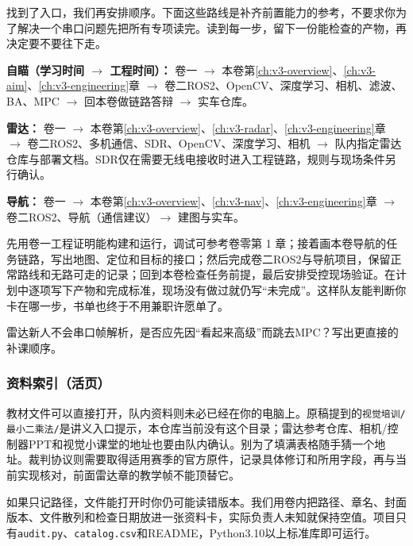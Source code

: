 找到了入口，我们再安排顺序。下面这些路线是补齐前置能力的参考，不要求你为了解决一个串口问题先把所有专项读完。读到每一步，留下一份能检查的产物，再决定要不要往下走。

\textbf{自瞄（学习时间 $\rightarrow$ 工程时间）：}
卷一 $\rightarrow$ 本卷第\ref{ch:v3-overview}、\ref{ch:v3-aim}、\ref{ch:v3-engineering}章 $\rightarrow$ 卷二ROS2、OpenCV、深度学习、相机、滤波、BA、MPC $\rightarrow$ 回本卷做链路答辩 $\rightarrow$ 实车仓库。

\textbf{雷达：}
卷一 $\rightarrow$ 本卷第\ref{ch:v3-overview}、\ref{ch:v3-radar}、\ref{ch:v3-engineering}章 $\rightarrow$ 卷二ROS2、多机通信、SDR、OpenCV、深度学习、相机 $\rightarrow$ 队内指定雷达仓库与部署文档。SDR仅在需要无线电接收时进入工程链路，规则与现场条件另行确认。

\textbf{导航：}
卷一 $\rightarrow$ 本卷第\ref{ch:v3-overview}、\ref{ch:v3-nav}、\ref{ch:v3-engineering}章 $\rightarrow$ 卷二ROS2、导航（通信建议）$\rightarrow$ 建图与实车。

\begin{example}[给导航新人排顺序]
先用卷一工程证明能构建和运行，调试可参考卷零第 1 章；接着画本卷导航的任务链路，写出地图、定位和目标的接口；然后完成卷二ROS2与导航项目，保留正常路线和无路可走的记录；回到本卷检查任务前提，最后安排受控现场验证。在计划中逐项写下产物和完成标准，现场没有做过就仍写“未完成”。这样队友能判断你卡在哪一步，书单也终于不用兼职许愿单了。
\end{example}

\begin{exercise}
\label{v3-ex-index-2}
雷达新人不会串口帧解析，是否应先因“看起来高级”而跳去MPC？写出更直接的补课顺序。
\end{exercise}

\subsubsection{资料索引（活页）}

教材文件可以直接打开，队内资料则未必已经在你的电脑上。原稿提到的\texttt{视觉培训/最小二乘法/}是讲义入口提示，本仓库当前没有这个目录；雷达参考仓库、相机/控制器PPT和视觉小课堂的地址也要由队内确认。别为了填满表格随手猜一个地址。裁判协议则需要取得适用赛季的官方原件，记录具体修订和所用字段，再与当前实现核对，前面雷达章的教学帧不能顶替它。

如果只记路径，文件能打开时你仍可能读错版本。我们用卷内把路径、章名、封面版本、文件散列和检查日期放进一张资料卡，实际负责人未知就保持空值。项目只有\texttt{audit.py}、\texttt{catalog.csv}和README，Python3.10以上标准库即可运行。

